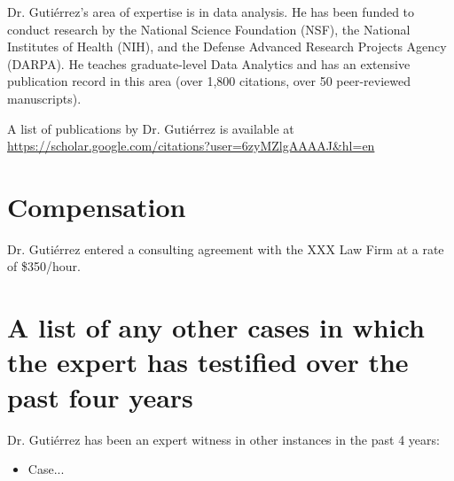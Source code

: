 \documentclass[12pt,reqno]{amsart}
\begin{document}
	Dr. Gutiérrez's area of expertise is in data analysis. He has been funded to conduct research by the National Science Foundation (NSF), the National Institutes of Health (NIH), and the  Defense Advanced Research Projects Agency (DARPA). He teaches graduate-level Data Analytics and has an extensive publication record in this area (over 1,800 citations, over 50 peer-reviewed manuscripts). 
	
	A list of publications by Dr. Gutiérrez is available at \url{https://scholar.google.com/citations?user=6zyMZlgAAAAJ&hl=en}
	
	\section{Compensation}
	Dr. Gutiérrez entered a consulting agreement with the XXX Law Firm at a rate of \$350/hour.
	
	\section{A list of any other cases in which the expert has testified over the past four years}
	Dr. Gutiérrez has been an expert witness in other instances in the past 4 years: 
	
	\begin{itemize}
		\item Case...
	\end{itemize}



	

\vspace{0.5em}
	


\vspace{0.5em}

	
	
	
		
	
\end{document}
